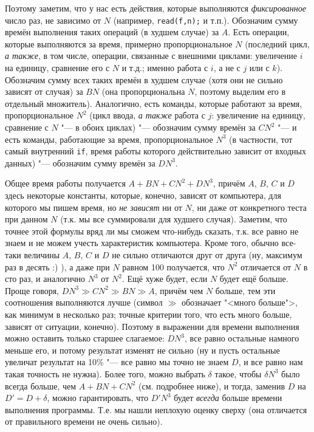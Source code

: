 \documentclass[a4paper,10pt]{problems}
\begin{document}
Поэтому заметим, что у нас есть действия, которые выполняются 
\textit{фиксированное} число раз, не зависимо от $N$ (например, 
\verb|read(f,n);| и т.п.). Обозначим сумму времён выполнения таких операций (в 
худшем случае) за $A$. Есть операции, которые выполняются за время, примерно 
пропорциональное $N$ (последний цикл, \textit{а также}, в том числе, операции, 
связанные с внешними циклами: увеличение $i$ на единицу, сравнение его с $N$ и 
т.д.; именно работа с $i$, а не с $j$ или с $k$). Обозначим сумму всех таких 
времён в худшем случае (хотя они не сильно зависят от случая) за $BN$ (она 
пропорциональна $N$, поэтому выделим его в отдельный множитель). Аналогично, 
есть команды, которые работают за время, пропорциональное $N^2$ (цикл ввода, 
\textit{а также} работа с $j$: увеличение на единицу, сравнение с $N$ "--- в 
обоих циклах) "--- обозначим сумму времён за $CN^2$ "--- и есть команды, 
работающие за время, пропорциональное $N^3$ (в частности, тот самый внутренний 
\verb|if|, время работы которого действительно зависит от входных данных) "--- 
обозначим сумму времён за $DN^3$.

Общее время работы получается $A+BN+CN^2+DN^3$, причём $A$, $B$, $C$ и $D$ 
здесь некоторые константы, которые, конечно, зависят от компьютера, для 
которого мы пишем время, но \textit{не зависят} ни от $N$, ни даже от 
конкретного теста при данном $N$ (т.к. мы все суммировали для худшего случая). 
Заметим, что точнее этой формулы вряд ли мы сможем что-нибудь сказать, т.к. все 
равно не знаем и не можем учесть характеристик компьютера. Кроме того, обычно 
все-таки величины $A$, $B$, $C$ и $D$ не сильно отличаются друг от друга (ну, 
максимум раз в десять :) ), а даже при $N$ равном 100 получается, что $N^2$ 
отличается от $N$ в сто раз, и аналогично $N^3$ от $N^2$. Ещё хуже будет, если 
$N$ будет ещё больше. Проще говоря, $DN^3\gg CN^2\gg BN \gg A$, причём чем $N$ 
больше, тем эти соотношения выполняются лучше (символ $\gg$ обозначает "<много 
больше">, как минимум в несколько раз; точные критерии того, что есть много 
больше, зависят от ситуации,  
конечно). Поэтому в выражении для времени выполнения можно оставить только 
старшее слагаемое: $DN^3$, все равно остальные намного меньше его, и потому 
результат изменят не сильно (ну и пусть остальные увеличат результат на 10\% 
"--- все равно мы точно не знаем $D$, и все равно нам такая точность не нужна). 
Более того, можно выбрать $\delta$ такое, чтобы $\delta N^3$ было всегда 
больше, чем $A+BN+CN^2$ (см. подробнее ниже), и тогда, заменив $D$ на 
$D'=D+\delta$, можно гарантировать, что $D'N^3$ будет \textit{всегда} больше 
времени выполнения программы. Т.е. мы нашли неплохую оценку сверху (она 
отличается от правильного времени не очень сильно).
\end{document}
